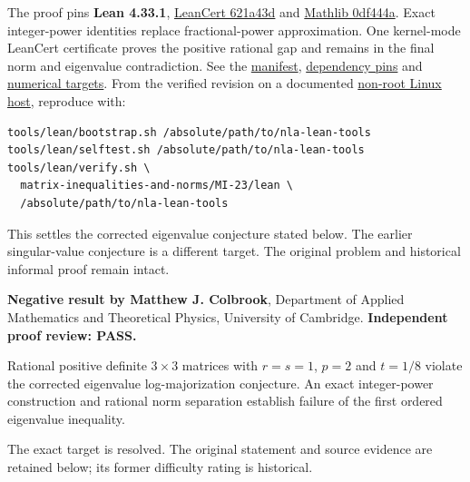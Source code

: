 \documentclass[11pt,a4paper]{article}
\makeatletter
\renewcommand{\subsection}{\Needspace{4\baselineskip}\@startsection{subsection}{2}{0pt}{9pt plus 1pt minus 1pt}{3pt}{\sffamily\bfseries\normalsize\color{ink}}}
\makeatother
\begin{document}
The proof pins \textbf{Lean 4.33.1},
\href{https://github.com/alerad/leancert/tree/621a43d7cf21f87872392a01e874f2f1dbddc926}{LeanCert
621a43d} and
\href{https://github.com/leanprover-community/mathlib4/tree/0df444a360eaa60ab8c11dca51a86af692955474}{Mathlib
0df444a}. Exact integer-power identities replace fractional-power
approximation. One kernel-mode LeanCert certificate proves the positive
rational gap and remains in the final norm and eigenvalue contradiction.
See the
\href{https://github.com/ajt60gaibb/OpenProblemsInNLA/blob/main/matrix-inequalities-and-norms/MI-23/lean/formalization.yaml}{manifest},
\href{https://github.com/ajt60gaibb/OpenProblemsInNLA/blob/main/matrix-inequalities-and-norms/MI-23/lean/lake-manifest.json}{dependency
pins} and
\href{https://github.com/ajt60gaibb/OpenProblemsInNLA/blob/main/matrix-inequalities-and-norms/MI-23/lean/NUMERICAL_TARGETS.md}{numerical
targets}. From the verified revision on a documented
\href{https://github.com/ajt60gaibb/OpenProblemsInNLA/blob/main/tools/lean/HARNESS.md}{non-root
Linux host}, reproduce with:

\begin{verbatim}
tools/lean/bootstrap.sh /absolute/path/to/nla-lean-tools
tools/lean/selftest.sh /absolute/path/to/nla-lean-tools
tools/lean/verify.sh \
  matrix-inequalities-and-norms/MI-23/lean \
  /absolute/path/to/nla-lean-tools
\end{verbatim}

This settles the corrected eigenvalue conjecture stated below. The
earlier singular-value conjecture is a different target. The original
problem and historical informal proof remain intact.

\subsection{Resolution --- 2026-09-11}\label{resolution-2026-09-11}

\textbf{Negative result by Matthew J. Colbrook}, Department of Applied
Mathematics and Theoretical Physics, University of Cambridge.
\textbf{Independent proof review: PASS.}

Rational positive definite \(3\times3\) matrices with \(r=s=1\), \(p=2\)
and \(t=1/8\) violate the corrected eigenvalue log-majorization
conjecture. An exact integer-power construction and rational norm
separation establish failure of the first ordered eigenvalue inequality.

The exact target is resolved. The original statement and source evidence
are retained below; its former difficulty rating is historical.
\end{document}
